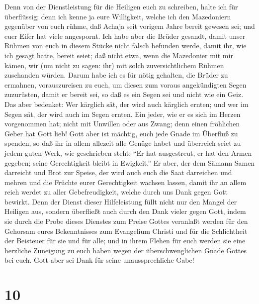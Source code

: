  Denn von der Dienstleistung für die Heiligen euch zu
schreiben, halte ich für überflüssig;  denn ich kenne ja
eure Willigkeit, welche ich den Mazedoniern gegenüber von euch rühme,
daß Achaja seit vorigem Jahre bereit gewesen sei; und euer Eifer hat
viele angespornt.  Ich habe aber die Brüder gesandt, damit
unser Rühmen von euch in diesem Stücke nicht falsch befunden werde,
damit ihr, wie ich gesagt hatte, bereit seiet;  daß nicht
etwa, wenn die Mazedonier mit mir kämen, wir (um nicht zu sagen: ihr)
mit solch zuversichtlichem Rühmen zuschanden würden. 
Darum habe ich es für nötig gehalten, die Brüder zu ermahnen,
vorauszureisen zu euch, um diesen zum voraus angekündigten Segen
zuzurüsten, damit er bereit sei, so daß es ein Segen sei und nicht wie
ein Geiz.  Das aber bedenket: Wer kärglich sät, der wird
auch kärglich ernten; und wer im Segen sät, der wird auch im Segen
ernten.  Ein jeder, wie er es sich im Herzen vorgenommen
hat; nicht mit Unwillen oder aus Zwang; denn einen fröhlichen Geber hat
Gott lieb!  Gott aber ist mächtig, euch jede Gnade im
Überfluß zu spenden, so daß ihr in allem allezeit alle Genüge habet und
überreich seiet zu jedem guten Werk,  wie geschrieben
steht: ``Er hat ausgestreut, er hat den Armen gegeben; seine
Gerechtigkeit bleibt in Ewigkeit.''  Er aber, der dem
Sämann Samen darreicht und Brot zur Speise, der wird auch euch die Saat
darreichen und mehren und die Früchte eurer Gerechtigkeit wachsen
lassen,  damit ihr an allem reich werdet zu aller
Gebefreudigkeit, welche durch uns Dank gegen Gott bewirkt.
 Denn der Dienst dieser Hilfeleistung füllt nicht nur den
Mangel der Heiligen aus, sondern überfließt auch durch den Dank vieler
gegen Gott,  indem sie durch die Probe dieses Dienstes
zum Preise Gottes veranlaßt werden für den Gehorsam eures Bekenntnisses
zum Evangelium Christi und für die Schlichtheit der Beisteuer für sie
und für alle;  und in ihrem Flehen für euch werden sie
eine herzliche Zuneigung zu euch haben wegen der überschwenglichen Gnade
Gottes bei euch.  Gott aber sei Dank für seine
unaussprechliche Gabe!

\hypertarget{section-9}{%
\section{10}\label{section-9}}

